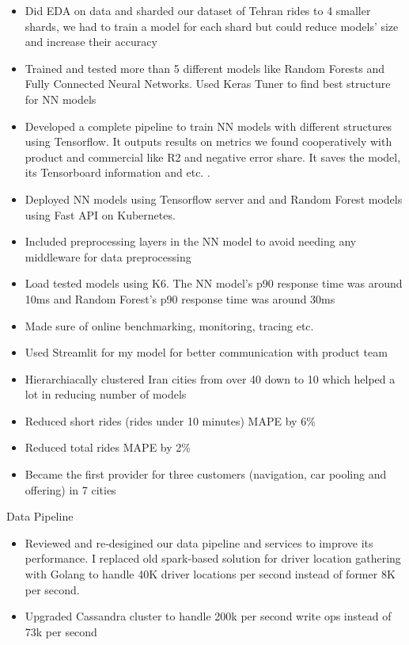 \begin{cventries}
{\begin{cvitems}
\begin{itemize}
          \item Did EDA on data and sharded our dataset of Tehran rides to 4 smaller shards, we had to train a model for each shard but could reduce models' size and increase their accuracy
          \item Trained and tested more than 5 different models like Random Forests and Fully Connected Neural Networks. Used Keras Tuner to find best structure for NN models
          \item Developed a complete pipeline to train NN models with different structures using Tensorflow. It outputs results on metrics we found cooperatively with product and commercial like R2 and negative error share. It saves the model, its Tensorboard information and etc. .
          \item Deployed NN models using Tensorflow server and and Random Forest models using Fast API on Kubernetes. 
          \item Included preprocessing layers in the NN model to avoid needing any middleware for data preprocessing
          \item Load tested models using K6. The NN model's p90 response time was around 10ms and Random Forest's p90 response time was around 30ms
          \item Made sure of online benchmarking, monitoring, tracing etc.
          \item Used Streamlit for my model for better communication with product team
          \item Hierarchiacally clustered Iran cities from over 40 down to 10 which helped a lot in reducing number of models
          \item Reduced short rides (rides under 10 minutes) MAPE by 6\%
          \item Reduced total rides MAPE by 2\%
          \item Became the first provider for three customers (navigation, car pooling and offering) in 7 cities
        \end{itemize}
        \item Data Pipeline
        \begin{itemize}
          \item Reviewed and re‐desigined our data pipeline and services to improve its performance. I replaced old spark‐based solution for driver location gathering with Golang to handle 40K driver locations per second instead of former 8K per second.
          \item Upgraded Cassandra cluster to handle 200k per second write ops instead of 73k per second

\end{itemize}
\end{cvitems}}
\end{cventries}
